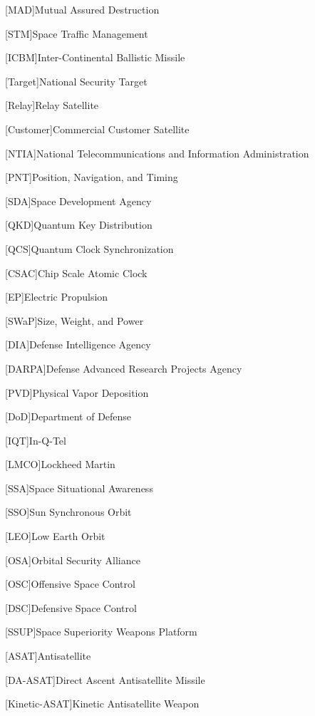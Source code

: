[MAD]{Mutual Assured Destruction}

[STM]{Space Traffic Management}

[ICBM]{Inter-Continental Ballistic Missile}

[Target]{National Security Target}

[Relay]{Relay Satellite}

[Customer]{Commercial Customer Satellite}

[NTIA]{National Telecommunications and Information
  Administration}

[PNT]{Position, Navigation, and Timing}

[SDA]{Space Development Agency}

[QKD]{Quantum Key Distribution}

[QCS]{Quantum Clock Synchronization}

[CSAC]{Chip Scale Atomic Clock}

[EP]{Electric Propulsion}

[SWaP]{Size, Weight, and Power}

[DIA]{Defense Intelligence Agency}

[DARPA]{Defense Advanced Research Projects Agency}

[PVD]{Physical Vapor Deposition}

[DoD]{Department of Defense}

[IQT]{In-Q-Tel}

[LMCO]{Lockheed Martin}

[SSA]{Space Situational Awareness}

[SSO]{Sun Synchronous Orbit}

[LEO]{Low Earth Orbit}

[OSA]{Orbital Security Alliance}

[OSC]{Offensive Space Control}

[DSC]{Defensive Space Control}

[SSUP]{Space Superiority Weapons Platform}

[ASAT]{Antisatellite}

[DA-ASAT]{Direct Ascent Antisatellite Missile}

[Kinetic-ASAT]{Kinetic Antisatellite Weapon}

